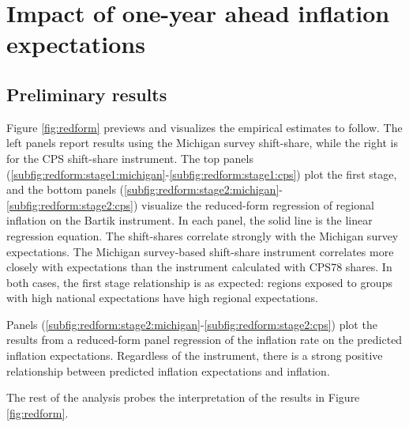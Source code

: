 \documentclass[12pt]{article}
\begin{document}
\section{Impact of one-year ahead inflation expectations}

\subsection{Preliminary results}

Figure \ref{fig:redform} previews and visualizes the empirical estimates to follow. The left panels report results using the Michigan survey shift-share, while the right is for the CPS shift-share instrument. The top panels (\ref{subfig:redform:stage1:michigan}-\ref{subfig:redform:stage1:cps}) plot the first stage, and the bottom panels (\ref{subfig:redform:stage2:michigan}-\ref{subfig:redform:stage2:cps}) visualize the reduced-form regression of regional inflation on the Bartik instrument. In each panel, the solid line is the linear regression equation. The shift-shares correlate strongly with the Michigan survey expectations. The Michigan survey-based shift-share instrument correlates more closely with expectations than the instrument calculated with CPS78 shares.  In both cases, the first stage relationship is as expected: regions exposed to groups with high national expectations have high regional expectations.

Panels (\ref{subfig:redform:stage2:michigan}-\ref{subfig:redform:stage2:cps}) plot the results from a reduced-form panel regression of the inflation rate on the predicted inflation expectations. Regardless of the instrument, there is a strong positive relationship between predicted inflation expectations and inflation.

The rest of the analysis probes the interpretation of the results in Figure \ref{fig:redform}.
\end{document}

